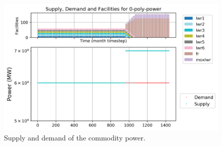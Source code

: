 \documentclass[11pt]{article}
\begin{document}
\begin{figure}[!h]
	\centering
	\includegraphics[width=\textwidth]{29-figures/0-poly-power.png} 
	\hfill
	\caption{Supply and demand of the commodity power.}
	\label{fig:29-power}
\end{figure}
\end{document}
